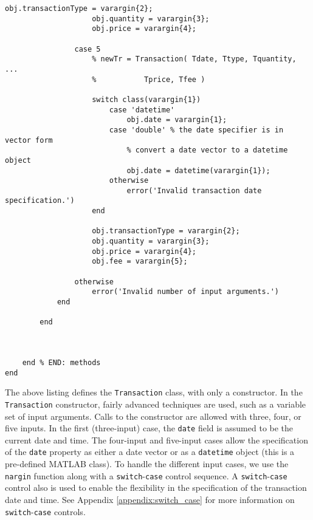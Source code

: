 \begin{lstlisting}[style=Matlab-editor]
                    obj.transactionType = varargin{2};
                    obj.quantity = varargin{3};
                    obj.price = varargin{4};
                    
                case 5
                    % newTr = Transaction( Tdate, Ttype, Tquantity, ...
                    %           Tprice, Tfee )
                    
                    switch class(varargin{1})
                        case 'datetime'
                            obj.date = varargin{1};
                        case 'double' % the date specifier is in vector form
                            % convert a date vector to a datetime object
                            obj.date = datetime(varargin{1});
                        otherwise
                            error('Invalid transaction date specification.')
                    end
                    
                    obj.transactionType = varargin{2};
                    obj.quantity = varargin{3};
                    obj.price = varargin{4};
                    obj.fee = varargin{5};
                    
                otherwise
                    error('Invalid number of input arguments.')
            end
            
        end
        

        
    end % END: methods
end
\end{lstlisting}

The above listing defines the \texttt{Transaction} class, with only a constructor. In the \texttt{Transaction} constructor, fairly advanced techniques are used, such as a variable set of input arguments. Calls to the constructor are allowed with three, four, or five inputs. In the first (three-input) case, the \texttt{date} field is assumed to be the current date and time. The four-input and five-input cases allow the specification of the \texttt{date} property as either a date vector or as a \texttt{datetime} object (this is a pre-defined MATLAB class). To handle the different input cases, we use the \texttt{nargin} function along with a \texttt{switch}-\texttt{case} control sequence. A \texttt{switch}-\texttt{case} control also is used to enable the flexibility in the specification of the transaction date and time. See Appendix \ref{appendix:switch_case} for more information on \texttt{switch}-\texttt{case} controls.

